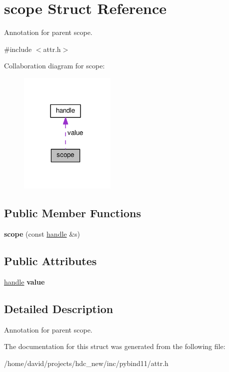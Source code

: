 \hypertarget{structscope}{}\section{scope Struct Reference}
\label{structscope}


Annotation for parent scope.  




{\ttfamily \#include $<$attr.\+h$>$}



Collaboration diagram for scope\+:
\nopagebreak
\begin{figure}[H]
\begin{center}
\leavevmode
\includegraphics[width=130pt]{structscope__coll__graph}
\end{center}
\end{figure}
\subsection*{Public Member Functions}
\begin{DoxyCompactItemize}
\item 
{\bfseries scope} (const \hyperlink{classhandle}{handle} \&s)\hypertarget{structscope_a5849bb2d6e0946e419e2f42f5273943d}{}\label{structscope_a5849bb2d6e0946e419e2f42f5273943d}

\end{DoxyCompactItemize}
\subsection*{Public Attributes}
\begin{DoxyCompactItemize}
\item 
\hyperlink{classhandle}{handle} {\bfseries value}\hypertarget{structscope_a3e53212de1c4692bf00cdba2e613458e}{}\label{structscope_a3e53212de1c4692bf00cdba2e613458e}

\end{DoxyCompactItemize}


\subsection{Detailed Description}
Annotation for parent scope. 

The documentation for this struct was generated from the following file\+:\begin{DoxyCompactItemize}
\item 
/home/david/projects/hdc\+\_\+new/inc/pybind11/attr.\+h\end{DoxyCompactItemize}
